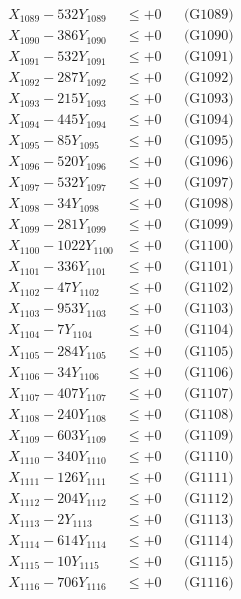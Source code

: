 \documentclass[a4paper,10pt]{article}
\begin{document}
{\begin{align}
X_{1089} - 532Y_{1089} &\leq +0 && \text{(G1089)} \\
X_{1090} - 386Y_{1090} &\leq +0 && \text{(G1090)} \\
\allowbreak
X_{1091} - 532Y_{1091} &\leq +0 && \text{(G1091)} \\
X_{1092} - 287Y_{1092} &\leq +0 && \text{(G1092)} \\
X_{1093} - 215Y_{1093} &\leq +0 && \text{(G1093)} \\
X_{1094} - 445Y_{1094} &\leq +0 && \text{(G1094)} \\
X_{1095} - 85Y_{1095} &\leq +0 && \text{(G1095)} \\
X_{1096} - 520Y_{1096} &\leq +0 && \text{(G1096)} \\
X_{1097} - 532Y_{1097} &\leq +0 && \text{(G1097)} \\
X_{1098} - 34Y_{1098} &\leq +0 && \text{(G1098)} \\
X_{1099} - 281Y_{1099} &\leq +0 && \text{(G1099)} \\
X_{1100} - 1022Y_{1100} &\leq +0 && \text{(G1100)} \\
\allowbreak
X_{1101} - 336Y_{1101} &\leq +0 && \text{(G1101)} \\
X_{1102} - 47Y_{1102} &\leq +0 && \text{(G1102)} \\
X_{1103} - 953Y_{1103} &\leq +0 && \text{(G1103)} \\
X_{1104} - 7Y_{1104} &\leq +0 && \text{(G1104)} \\
X_{1105} - 284Y_{1105} &\leq +0 && \text{(G1105)} \\
X_{1106} - 34Y_{1106} &\leq +0 && \text{(G1106)} \\
X_{1107} - 407Y_{1107} &\leq +0 && \text{(G1107)} \\
X_{1108} - 240Y_{1108} &\leq +0 && \text{(G1108)} \\
X_{1109} - 603Y_{1109} &\leq +0 && \text{(G1109)} \\
X_{1110} - 340Y_{1110} &\leq +0 && \text{(G1110)} \\
\allowbreak
X_{1111} - 126Y_{1111} &\leq +0 && \text{(G1111)} \\
X_{1112} - 204Y_{1112} &\leq +0 && \text{(G1112)} \\
X_{1113} - 2Y_{1113} &\leq +0 && \text{(G1113)} \\
X_{1114} - 614Y_{1114} &\leq +0 && \text{(G1114)} \\
X_{1115} - 10Y_{1115} &\leq +0 && \text{(G1115)} \\
X_{1116} - 706Y_{1116} &\leq +0 && \text{(G1116)} \\

\end{align}}
\end{document}
